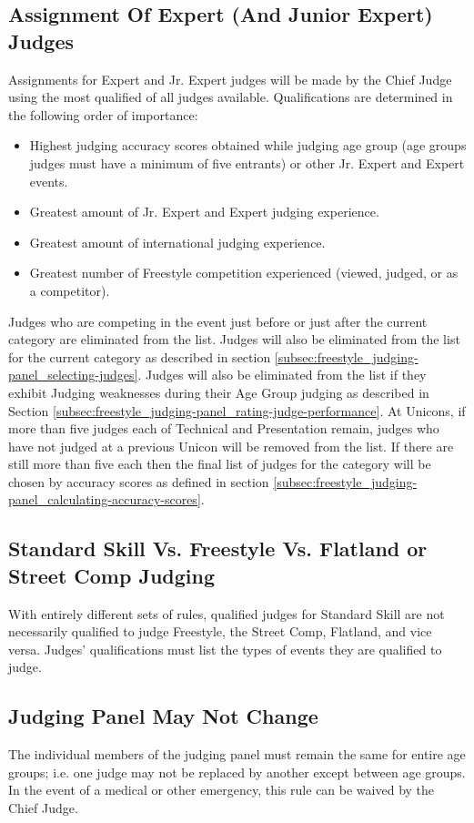 \subsection{Assignment Of Expert (And Junior Expert) Judges \label{subsec:freestyle_judging-panel_assignment-of-expert-judges}}
Assignments for Expert and Jr. Expert judges will be made by the Chief Judge using the most qualified of all judges available.
Qualifications are determined in the following order of importance: 
\begin{itemize}
\item Highest judging accuracy scores obtained while judging age group (age groups judges must have a minimum of five entrants) or other Jr. Expert and Expert events.
\item Greatest amount of Jr. Expert and Expert judging experience.
\item Greatest amount of international judging experience.
\item Greatest number of Freestyle competition experienced (viewed, judged, or as a competitor).
\end{itemize}
Judges who are competing in the event just before or just after the current category are eliminated from the list.
Judges will also be eliminated from the list for the current category as described in section \ref{subsec:freestyle_judging-panel_selecting-judges}.
Judges will also be eliminated from the list if they exhibit Judging weaknesses during their Age Group judging as described in Section \ref{subsec:freestyle_judging-panel_rating-judge-performance}.
At Unicons, if more than five judges each of Technical and Presentation remain, judges who have not judged at a previous Unicon will be removed from the list.
If there are still more than five each then the final list of judges for the category will be chosen by accuracy scores as defined in section \ref{subsec:freestyle_judging-panel_calculating-accuracy-scores}.

\subsection{Standard Skill Vs. Freestyle Vs. Flatland or Street Comp Judging}
With entirely different sets of rules, qualified judges for Standard Skill are not necessarily qualified to judge Freestyle, the Street Comp, Flatland, and vice versa.
Judges' qualifications must list the types of events they are qualified to judge.

\subsection{Judging Panel May Not Change}
The individual members of the judging panel must remain the same for entire age groups; i.e. one judge may not be replaced by another except between age groups.
In the event of a medical or other emergency, this rule can be waived by the Chief Judge.

